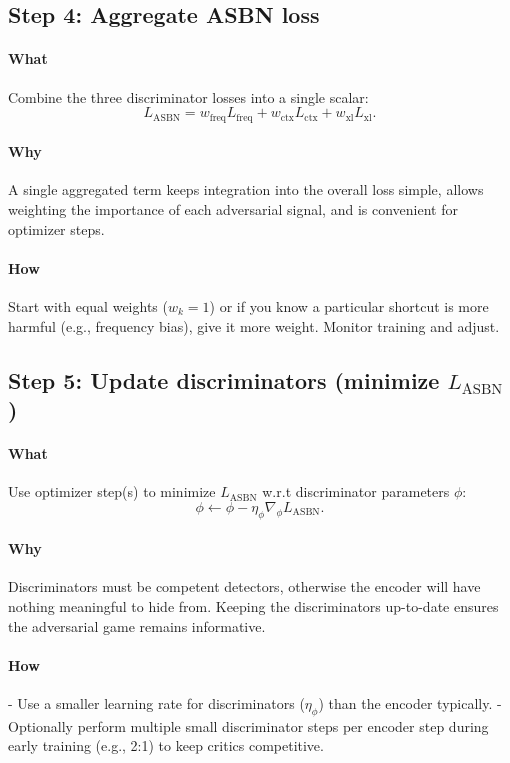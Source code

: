 \documentclass[11pt]{article}
\begin{document}
\subsection*{Step 4: Aggregate ASBN loss}
\paragraph{What}
Combine the three discriminator losses into a single scalar:
\[
L_{\text{ASBN}} = w_{\text{freq}}L_{\text{freq}} + w_{\text{ctx}}L_{\text{ctx}} + w_{\text{xl}}L_{\text{xl}}.
\]

\paragraph{Why}
A single aggregated term keeps integration into the overall loss simple, allows weighting the importance of each adversarial signal, and is convenient for optimizer steps.

\paragraph{How}
Start with equal weights ($w_k=1$) or if you know a particular shortcut is more harmful (e.g., frequency bias), give it more weight. Monitor training and adjust.

\subsection*{Step 5: Update discriminators (minimize $L_{\text{ASBN}}$)}
\paragraph{What}
Use optimizer step(s) to minimize $L_{\text{ASBN}}$ w.r.t discriminator parameters $\phi$:
\[
\phi \leftarrow \phi - \eta_\phi \nabla_\phi L_{\text{ASBN}}.
\]

\paragraph{Why}
Discriminators must be competent detectors, otherwise the encoder will have nothing meaningful to hide from. Keeping the discriminators up-to-date ensures the adversarial game remains informative.

\paragraph{How}
- Use a smaller learning rate for discriminators ($\eta_\phi$) than the encoder typically.  
- Optionally perform multiple small discriminator steps per encoder step during early training (e.g., 2:1) to keep critics competitive.
\end{document}
